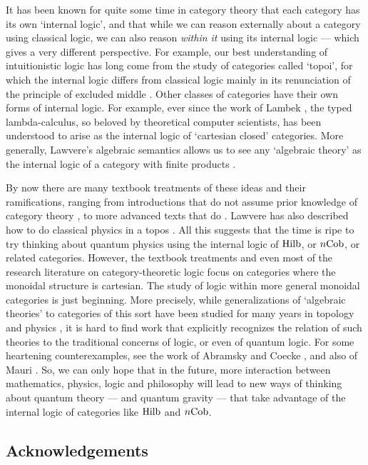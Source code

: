 \documentclass[12pt]{article}
\newcommand{\Hilb}{{\rm Hilb}}
\newcommand{\Cob}{{\rm Cob}}
\begin{document}
It has been known for quite some time in category theory that
each category has its own `internal logic', and that while we can 
reason externally about a category using classical logic, we can also 
reason {\it within it} using its internal logic --- which gives a very
different perspective.  For example, our best understanding of 
intuitionistic logic has long come from the study of categories called 
`topoi', for which the internal logic differs from classical
logic mainly in its renunciation of the principle 
of excluded middle \cite{BJ,Coste,Mitchell}.  
Other classes of categories have their own forms of internal
logic.  For example, ever since the work of Lambek \cite{Lambek},
the typed lambda-calculus, so beloved by theoretical
computer scientists, has been understood to arise 
as the internal logic of `cartesian closed' categories. 
More generally, Lawvere's algebraic semantics allows
us to see any `algebraic theory' as the internal logic of 
a category with finite products \cite{Lawvere}.  

By now there are many textbook treatments of these ideas and
their ramifications, ranging from introductions that do not assume
prior knowledge of category theory \cite{Crole,McLarty},
to more advanced texts that do \cite{BW,Johnstone,LS,MM}.
Lawvere has also described how to do classical physics in a topos
\cite{Lawvere2,Lawvere3}.
All this suggests that the time is ripe to try thinking about
quantum physics using the internal logic of $\Hilb$, or $n\Cob$, or
related categories.  However, the textbook treatments and even
most of the research literature on category-theoretic logic
focus on categories where the monoidal structure is cartesian.  
The study of logic within more general monoidal categories is 
just beginning.  More precisely, while generalizations of
`algebraic theories' to categories of this sort have been studied 
for many years in topology and physics \cite{LSV,MSS}, it is 
hard to find work that explicitly recognizes the relation of such 
theories to the traditional concerns of logic, or even of quantum logic.
For some heartening counterexamples, see the work of Abramsky
and Coecke \cite{AC}, and also of Mauri \cite{Mauri}.  So, we can 
only hope that in the future, more interaction between mathematics,
physics, logic and philosophy will lead to new ways of thinking about 
quantum theory --- and quantum gravity --- that take advantage of 
the internal logic of categories like $\Hilb$ and $n\Cob$.

\subsection*{Acknowledgements}
\end{document}
